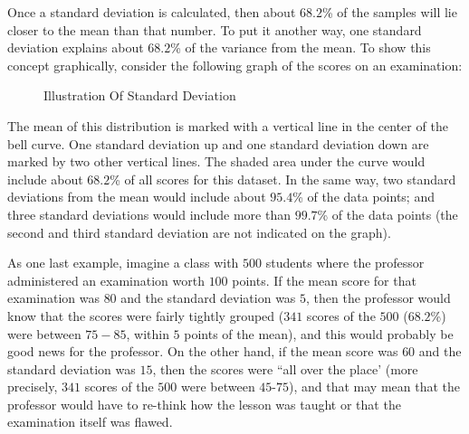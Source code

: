 Once a standard deviation is calculated, then about $ 68.2 $\% of the samples will lie closer to the mean than that number. To put it another way, one standard deviation explains about $ 68.2 $\% of the variance from the mean. To show this concept graphically, consider the following graph of the scores on an examination:

\begin{figure}[H]
  \begin{center}
    \caption{Illustration Of Standard Deviation}
    \label{lab03_fig01}
  \end{center}
\end{figure}

The mean of this distribution is marked with a vertical line in the center of the bell curve. One standard deviation up and one standard deviation down are marked by two other vertical lines. The shaded area under the curve would include about $ 68.2 $\% of all scores for this dataset. In the same way, two standard deviations from the mean would include about $ 95.4 $\% of the data points; and three standard deviations would include more than $ 99.7 $\% of the data points (the second and third standard deviation are not indicated on the graph).

As one last example, imagine a class with $ 500 $ students where the professor administered an examination worth $ 100 $ points. If the mean score for that examination was $ 80 $ and the standard deviation was $ 5 $, then the professor would know that the scores were fairly tightly grouped ($ 341 $ scores of the $ 500 $ ($ 68.2 $\%) were between $ 75-85 $, within $ 5 $ points of the mean), and this would probably be good news for the professor. On the other hand, if the mean score was $ 60 $ and the standard deviation was $ 15 $, then the scores were ``all over the place' (more precisely, $ 341 $ scores of the $ 500 $ were between $ 45 $-$ 75 $), and that may mean that the professor would have to re-think how the lesson was taught or that the examination itself was flawed.

